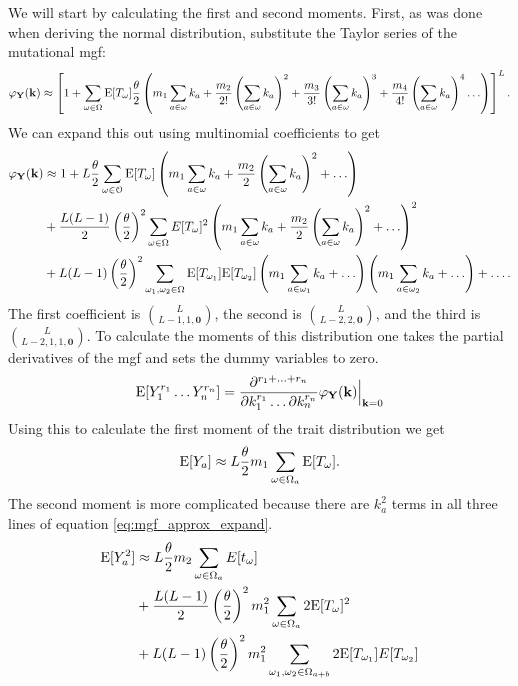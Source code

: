 We will start by calculating the first and second moments. First, as was done
when deriving the normal distribution, substitute the Taylor series of the
mutational mgf:
\begin{equation}
  \label{eq:mgf_approx_sub}
  \varphi_{\mathbf{Y}}(\mathbf{k}) \approx \left[ 1 + \sum_{\omega \in \Omega}
    \mathrm{E}[T_\omega] \frac{\theta}{2} \left( m_1 \sum_{a \in \omega} k_a +
    \frac{m_2}{2!}\left( \sum_{a \in \omega} k_a\right)^2 +
    \frac{m_3}{3!}\left( \sum_{a \in \omega} k_a\right)^3 +
    \frac{m_4}{4!}\left( \sum_{a \in \omega} k_a\right)^4 \ldots \right) \right]^L.
\end{equation}
We can expand this out using multinomial coefficients to get
\begin{align}
  \label{eq:mgf_approx_expand}
  \varphi_{\mathbf{Y}}(\mathbf{k}) &\approx 1 +
  L\frac{\theta}{2} \sum_{\omega \in \mathcal{O}} \mathrm{E}[T_{\omega}]\left( m_1 \sum_{a \in \omega} k_a +
  \frac{m_2}{2}\left( \sum_{a \in \omega} k_a\right)^2 + \ldots \right) \nonumber \\
  &+ \frac{L(L-1)}{2} \left(\frac{\theta}{2}\right)^2 \sum_{\omega \in \Omega} E[T_{\omega}]^2
  \left( m_1 \sum_{a \in \omega} k_a +
  \frac{m_2}{2}\left( \sum_{a \in \omega} k_a\right)^2 + \ldots \right)^2 \nonumber \\
  &+ L(L-1)\left(\frac{\theta}{2}\right)^2\sum_{\omega_1, \omega_2 \in \Omega}\mathrm{E}[T_{\omega_1}]\mathrm{E}[T_{\omega_2}]
  \left( m_1 \sum_{a \in \omega_1} k_a + \ldots \right)
  \left( m_1 \sum_{a \in \omega_2} k_a + \ldots \right) + \ldots.
\end{align}
The first coefficient is $\binom{L}{L-1,1,\mathbf{0}}$, the second is
$\binom{L}{L-2,2,\mathbf{0}}$, and the third is $\binom{L}{L-2,1,1,\mathbf{0}}$.
To calculate the moments of this distribution one takes the partial derivatives
of the mgf and sets the dummy variables to zero.
\begin{equation}
  \label{eq:deriv}
  \mathrm{E}[Y_1^{r_1}\ldots Y_n^{r_n}] = \frac{\partial^{r_1 + \ldots + r_n}}{\partial k_1^{r_1} \ldots \partial k_n^{r_n}}
  \varphi_{\mathbf{Y}}(\mathbf{k})\Bigr|_{\mathbf{k}=0}
\end{equation}
Using this to calculate the first moment of the trait distribution we get
\begin{equation}
  \label{eq:mom1}
  \mathrm{E}[Y_a] \approx L\frac{\theta}{2} m_1 \sum_{\omega \in \Omega_a} \mathrm{E}[T_\omega].
\end{equation}
The second moment is more complicated because there are $k_a^2$ terms in all
three lines of equation \ref{eq:mgf_approx_expand}.
\begin{align}
  \mathrm{E}[Y_a^2] &\approx L\frac{\theta}{2} m_2 \sum_{\omega \in \Omega_a} E[t_\omega] \nonumber \\
  &+ \frac{L(L-1)}{2} \left(\frac{\theta}{2} \right)^2 m_1^2 \sum_{\omega \in \Omega_a} 2 \mathrm{E}[T_\omega]^2 \nonumber \\
  &+ L(L-1) \left(\frac{\theta}{2} \right)^2 m_1^2 \sum_{\omega_1 , \omega_2 \in \Omega_{a+b}} 2 \mathrm{E}[T_{\omega_1}]E[T_{\omega_2}]
\end{align}
